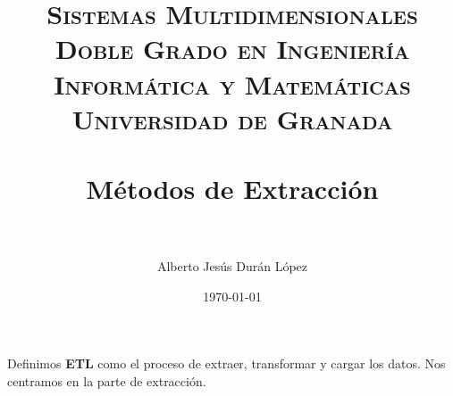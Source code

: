 
\usepackage{listings}
\usepackage{dsfont}
\usepackage{booktabs}

\title{	
\normalfont \normalsize 
\textsc{\textbf{Sistemas Multidimensionales} \\ Doble Grado en Ingeniería Informática y Matemáticas \\ Universidad de Granada} \\ [25pt] %
\horrule{0.5pt} \\[0.4cm] %
\huge Métodos de Extracción  \\ %
\horrule{2pt} \\[0.5cm] %
}
\author{Alberto Jesús Durán López} %
\date{\normalsize\today} %




\maketitle %

\newpage %





Definimos \textbf{ETL} como el proceso de extraer, transformar y cargar los datos. Nos centramos en la parte de extracción.


